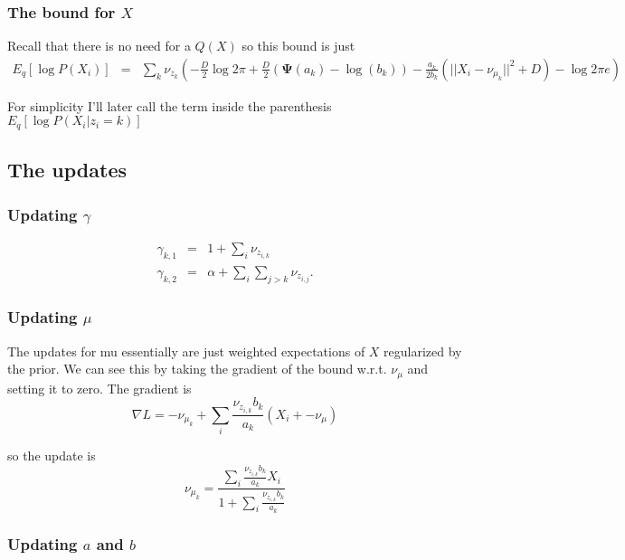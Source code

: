 \documentclass{article}
\newcommand{\digamma}{\bm{\Psi}}
\newcommand{\m}[1]{\nu_{#1}}
\begin{document}
\subsubsection{The bound for $X$}
\label{sec:bound-theta}

Recall that there is no need for a $Q(X)$ so this bound is just
\begin{eqnarray*}
  E_q[\log P(X_i)] &=& \sum_k \m{z_k} \left( - \frac{D}{2}\log 2\pi 
    +\frac{D}{2} (\digamma(a_k) - \log(b_k))
    -\frac{a_k}{2b_k} (||X_i - \m{\mu_k}||^2+D) - \log 2 \pi e  \right)
\end{eqnarray*}

For simplicity I'll later call the term inside the parenthesis $E_q[\log P(X_i|z_i=k)]$

\subsection{The updates}
\label{sec:updates}

\subsubsection{Updating $\gamma$}
\label{sec:updating-gamma}

\begin{eqnarray}
  \gamma_{k,1} &=& 1+\sum_i \m{z_{i,k}} \\
  \gamma_{k,2} &=& \alpha + \sum_i \sum_{j > k} \m{z_{i,j}}. 
\end{eqnarray}

\subsubsection{Updating $\mu$}
\label{sec:updating-mu}

The updates for mu essentially are just weighted expectations of
$X$ regularized by the prior. We can see this by taking the
gradient of the bound w.r.t. $\m{\mu}$ and setting it to zero. The
gradient is
\begin{equation}
  \nabla L = -\m{\mu_k} + \sum_i \frac{\m{z_{i,k}}b_k}{a_k}(X_i + -\m{\mu})
\end{equation}

so the update is
\begin{equation}
  \m{\mu_k} = \frac{\sum_i \frac{\m{z_{i,k}}b_k}{a_k}X_i}{1+\sum_i \frac{\m{z_{i,k}}b_k}{a_k}}
\end{equation}


\subsubsection{Updating $a$ and $b$}
\label{sec:updating-ab}
\end{document}
